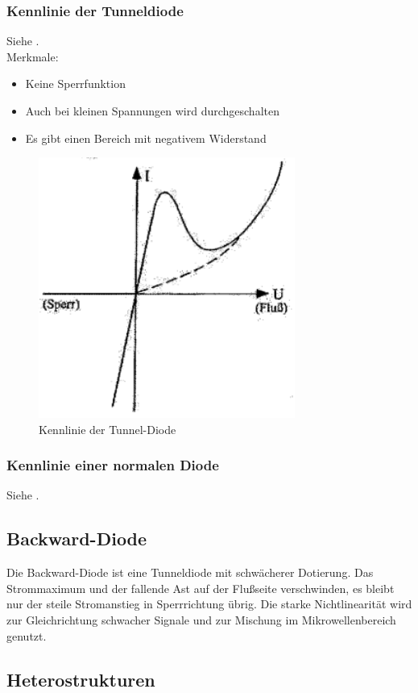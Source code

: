     \subsubsection{Kennlinie der Tunneldiode}
    Siehe .\\
    Merkmale:
    \begin{itemize}
        \item Keine Sperrfunktion
        \item Auch bei kleinen Spannungen wird durchgeschalten
        \item Es gibt einen Bereich mit negativem Widerstand
    \end{itemize}
    \begin{figure}[h]
        \centering
        \includegraphics[width=0.75\textwidth]{fig/tunneldiode}
        \caption{Kennlinie der Tunnel-Diode}
        \label{fig:tunneldiodeKennlinie}
    \end{figure}
    
    \subsubsection{Kennlinie einer normalen Diode}
    Siehe .

\subsection{Backward-Diode }\label{k5:backward}
Die Backward-Diode ist eine Tunneldiode mit schw\"acherer Dotierung. Das Strommaximum und der fallende Ast
auf der Flu{\ss}seite verschwinden, es bleibt nur der steile Stromanstieg in Sperrrichtung \"ubrig.
Die starke Nichtlinearit\"at wird zur Gleichrichtung schwacher Signale und zur Mischung im Mikrowellenbereich
genutzt.

\subsection{Heterostrukturen }\label{k5:heterostrukturen}